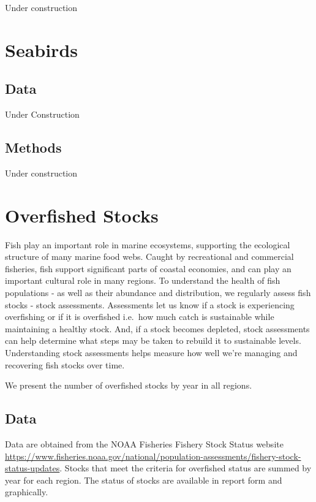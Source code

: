 \documentclass[
]{book}
\begin{document}
Under construction

\hypertarget{seabirds}{%
\chapter{Seabirds}\label{seabirds}}

\hypertarget{data-4}{%
\section{Data}\label{data-4}}

Under Construction

\hypertarget{methods-4}{%
\section{Methods}\label{methods-4}}

Under construction

\hypertarget{overfished-stocks}{%
\chapter{Overfished Stocks}\label{overfished-stocks}}

Fish play an important role in marine ecosystems, supporting the ecological structure of many marine food webs. Caught by recreational and commercial fisheries, fish support significant parts of coastal economies, and can play an important cultural role in many regions. To understand the health of fish populations - as well as their abundance and distribution, we regularly assess fish stocks - stock assessments. Assessments let us know if a stock is experiencing overfishing or if it is overfished i.e.~how much catch is sustainable while maintaining a healthy stock. And, if a stock becomes depleted, stock assessments can help determine what steps may be taken to rebuild it to sustainable levels. Understanding stock assessments helps measure how well we're managing and recovering fish stocks over time.

We present the number of overfished stocks by year in all regions.

\hypertarget{data-5}{%
\section{Data}\label{data-5}}

Data are obtained from the NOAA Fisheries Fishery Stock Status website \url{https://www.fisheries.noaa.gov/national/population-assessments/fishery-stock-status-updates}. Stocks that meet the criteria for overfished status are summed by year for each region. The status of stocks are available in report form and graphically.
\end{document}
